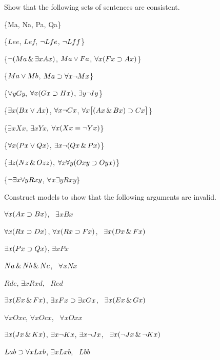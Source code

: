 \problempart
Show that the following sets of sentences are consistent.
\begin{earg}
\item \{Ma, \enot Na, Pa, \enot Qa\}
\item \{$Lee$, $Lef$, $\neg Lfe$, $\neg Lff$\}
\item \{$\neg (Ma \,\&\, \exists x Ax)$, $Ma \vee Fa$, $\forall x(Fx \supset Ax)$\}
\item \{$Ma \vee Mb$, $Ma \supset \forall x \neg Mx$\}
\item \{$\forall y Gy$, $\forall x (Gx \supset Hx)$, $\exists y \neg Iy$\}
\item \{$\exists x(Bx \vee Ax)$, $\forall x \neg Cx$, $\forall x\bigl[(Ax \,\&\, Bx) \supset Cx\bigr]$\}
\item \{$\exists x Xx$, $\exists x Yx$, $\forall x(Xx \equiv \neg Yx)$\}
\item \{$\forall x(Px \vee Qx)$, $\exists x\neg(Qx \,\&\, Px)$\}
\item \{$\exists z(Nz \,\&\, Ozz)$, $\forall x\forall y(Oxy \supset Oyx)$\}
\item \{$\neg \exists x \forall y Rxy$, $\forall x \exists y Rxy$\}
\end{earg}


\problempart
Construct models to show that the following arguments are invalid.
\begin{earg}
\item $\forall x(Ax \supset Bx)$, \therefore\ $\exists x Bx$
\item $\forall x(Rx \supset Dx)$, $\forall x(Rx \supset Fx)$, \therefore\ $\exists x(Dx \,\&\, Fx)$
\item $\exists x(Px\supset Qx)$, \therefore $\exists x Px$
\item $Na \,\&\, Nb \,\&\, Nc$, \therefore\ $\forall x Nx$
\item $Rde$, $\exists x Rxd$, \therefore\ $Red$
\item $\exists x(Ex \,\&\, Fx)$, $\exists x Fx \supset \exists x Gx$, \therefore\ $\exists x(Ex \,\&\, Gx)$
\item $\forall x Oxc$, $\forall x Ocx$, \therefore\ $\forall x Oxx$
\item $\exists x(Jx \,\&\, Kx)$, $\exists x \neg Kx$, $\exists x \neg Jx$, \therefore\ $\exists x(\neg Jx \,\&\, \neg Kx)$
\item $Lab \supset \forall x Lxb$, $\exists x Lxb$, \therefore\ $Lbb$
\end{earg}





